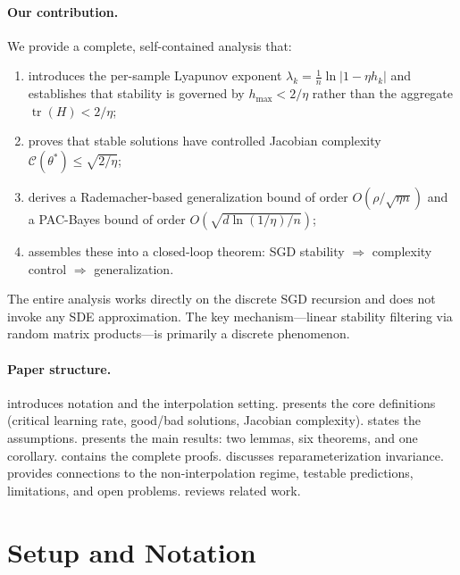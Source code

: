 \documentclass[11pt,a4paper]{article}
\theoremstyle{definition}
\theoremstyle{remark}
\DeclareMathOperator{\tr}{tr}
\newcommand{\cC}{\mathcal{C}}
\begin{document}
\paragraph{Our contribution.}
We provide a complete, self-contained analysis that:
\begin{enumerate}[label=(\roman*)]
  \item introduces the per-sample Lyapunov exponent
    $\lambda_k = \frac{1}{n}\ln|1 - \eta h_k|$ and establishes that stability is
    governed by $h_{\max} < 2/\eta$ rather than the aggregate $\tr(H) < 2/\eta$;
  \item proves that stable solutions have controlled Jacobian complexity
    $\cC(\theta^*) \leq \sqrt{2/\eta}$;
  \item derives a Rademacher-based generalization bound of order
    $O(\rho/\sqrt{\eta n})$ and a PAC-Bayes bound of order
    $O(\sqrt{d\ln(1/\eta)/n})$;
  \item assembles these into a closed-loop theorem: SGD stability $\Rightarrow$
    complexity control $\Rightarrow$ generalization.
\end{enumerate}

The entire analysis works directly on the discrete SGD recursion and does not
invoke any SDE approximation.  The key mechanism---linear stability filtering via
random matrix products---is primarily a discrete phenomenon.

\paragraph{Paper structure.}
 introduces notation and the interpolation setting.
 presents the core definitions (critical learning rate,
good/bad solutions, Jacobian complexity).
 states the assumptions.
 presents the main results: two lemmas, six theorems, and one
corollary.
 contains the complete proofs.
 discusses reparameterization invariance.
 provides connections to the non-interpolation regime,
testable predictions, limitations, and open problems.
 reviews related work.

\section{Setup and Notation}\label{sec:setup}
\end{document}
